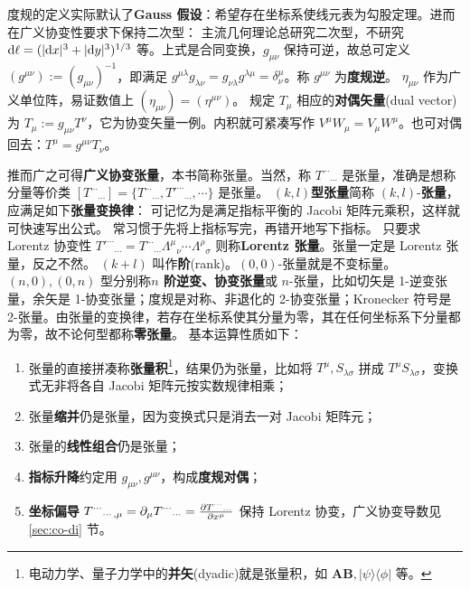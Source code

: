 度规的定义实际默认了\textbf{Gauss 假设}：希望存在坐标系使线元表为勾股定理。进而在广义协变性要求下保持二次型：
主流几何理论总研究二次型，不研究 $\dd\ell=(|\dd x|^3+|\dd y|^3)^{1/3}$ 等。上式是合同变换，$g_{\mu\nu}$ 保持可逆，故总可定义 $(g^{\mu\nu}):=(g_{\mu\nu})^{-1}$，即满足 $g^{\mu \lambda} g_{\lambda\nu}=g_{\nu\lambda}g^{\lambda\mu}=\delta^\mu_\nu$。称 $g^{\mu\nu}$ 为\textbf{度规逆}。
$\eta_{\mu\nu}$ 作为广义单位阵，易证数值上 $(\eta_{\mu\nu})=(\eta^{\mu\nu})$。
规定 $T_\mu$ 相应的\textbf{对偶矢量}(dual vector)为 $T_\mu:=g_{\mu\nu}T^\nu$，它为协变矢量一例。内积就可紧凑写作 $V^\mu W_\mu=V_\mu W^\mu$。也可对偶回去：$T^\mu=g^{\mu\nu}T_\nu$。

推而广之可得\textbf{广义协变张量}，本书简称张量。当然，称 $T^{\cdots}{}_{\cdots}$ 是张量，准确是想称分量等价类 $[T^{\cdots}{}_{\cdots}]=\{T^{\cdots}{}_{\cdots},T'^{\cdots}{}_{\cdots},\cdots\}$ 是张量。
$(k,l)$\textbf{型张量}简称 $(k,l)$-\textbf{张量}，应满足如下\textbf{张量变换律}：
可记忆为是满足指标平衡的 Jacobi 矩阵元乘积，这样就可快速写出公式。
常习惯于先将上指标写完，再错开地写下指标。
只要求 Lorentz 协变性 $T'^{\cdots}{}_{\cdots}=T^{\cdots}{}_{\cdots}\Lambda^\mu{}_\nu\cdots \Lambda^\rho{}_\sigma$ 则称\textbf{Lorentz 张量}。张量一定是 Lorentz 张量，反之不然。
$(k+l)$ 叫作\textbf{阶}(rank)。$(0,0)$-张量就是不变标量。$(n,0),(0,n)$ 型分别称\textbf{$n$ 阶逆变、协变张量}或 $n$-张量，比如切矢是 1-逆变张量，余矢是 1-协变张量；度规是对称、非退化的 2-协变张量；Kronecker 符号是 2-张量。由张量的变换律，若存在坐标系使其分量为零，其在任何坐标系下分量都为零，故不论何型都称\textbf{零张量}。
基本运算性质如下：
\begin{enumerate}
    \item 张量的直接拼凑称\textbf{张量积}\footnote{电动力学、量子力学中的\textbf{并矢}(dyadic)就是张量积，如 $\bm A\bm B,|\psi\rangle\langle\phi|$ 等。}，结果仍为张量，比如将 $T^\mu,S_{\lambda\sigma}$ 拼成 $T^\mu S_{\lambda\sigma}$，变换式无非将各自 Jacobi 矩阵元按实数规律相乘；
    \item 张量\textbf{缩并}仍是张量，因为变换式只是消去一对 Jacobi 矩阵元；
    \item 张量的\textbf{线性组合}仍是张量；
    \item \textbf{指标升降}约定用 $g_{\mu\nu},g^{\mu\nu}$，构成\textbf{度规对偶}；
    \item \textbf{坐标偏导} $T^{\cdots}{}_{\cdots,\mu}=\partial_\mu T^{\cdots}{}_{\cdots}=\pdv{T^{\cdots}{}_{\cdots}}{x^\mu}$ 保持 Lorentz 协变，广义协变导数见 \ref{sec:co-di} 节。
\end{enumerate}

